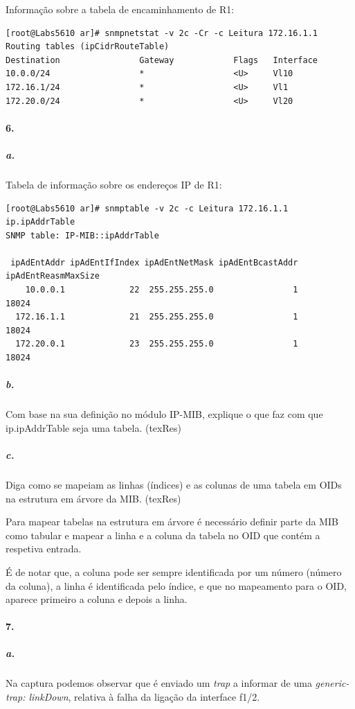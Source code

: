 \newpage

Informação sobre a tabela de encaminhamento de \textsf{R1}:
\begin{verbatim}
[root@Labs5610 ar]# snmpnetstat -v 2c -Cr -c Leitura 172.16.1.1
Routing tables (ipCidrRouteTable)
Destination                Gateway            Flags   Interface
10.0.0/24                  *                  <U>     Vl10
172.16.1/24                *                  <U>     Vl1
172.20.0/24                *                  <U>     Vl20
\end{verbatim}


\paragraph{6.}

\subparagraph{a.}
Tabela de informação sobre os endereços IP de \textsf{R1}:
\begin{verbatim}
[root@Labs5610 ar]# snmptable -v 2c -c Leitura 172.16.1.1 ip.ipAddrTable
SNMP table: IP-MIB::ipAddrTable

 ipAdEntAddr ipAdEntIfIndex ipAdEntNetMask ipAdEntBcastAddr ipAdEntReasmMaxSize
    10.0.0.1             22  255.255.255.0                1               18024
  172.16.1.1             21  255.255.255.0                1               18024
  172.20.0.1             23  255.255.255.0                1               18024

\end{verbatim}


\subparagraph{b.}
Com base na sua definição no módulo IP-MIB, explique o que faz com que ip.ipAddrTable seja uma tabela. (texRes)


\subparagraph{c.}
Diga como se mapeiam as linhas (índices) e as colunas de uma tabela em OIDs na estrutura em árvore da MIB. (texRes)

Para mapear tabelas na estrutura em árvore é necessário definir parte da MIB como tabular e mapear a linha e a coluna da tabela no OID que contém a respetiva entrada.

É de notar que, a coluna pode ser sempre identificada por um número (número da coluna), a linha é identificada pelo índice, e que no mapeamento para o OID, aparece primeiro a coluna e depois  a linha.


\paragraph{7.}

\subparagraph{a.}
Na captura podemos observar que é enviado um \emph{trap} a informar de uma \emph{generic-trap: linkDown}, relativa à falha da ligação da interface \textsf{f1/2}.

